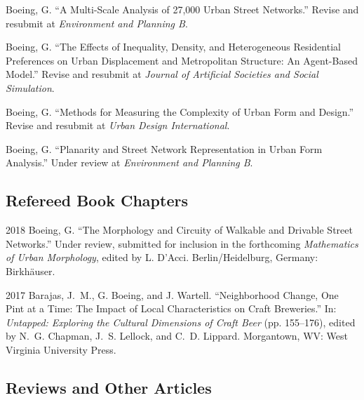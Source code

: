 \documentclass{academiccv}
\begin{document}
\begin{tablist}
	
\item[\the\year] \tab Boeing, G. \enquote{A Multi-Scale Analysis of 27,000 Urban Street Networks.} Revise and resubmit at \textit{Environment and Planning B}.

\item[\the\year] \tab Boeing, G. \enquote{The Effects of Inequality, Density, and Heterogeneous Residential Preferences on Urban Displacement and Metropolitan Structure: An Agent-Based Model.} Revise and resubmit at \textit{Journal of Artificial Societies and Social Simulation}.

\item[\the\year] \tab Boeing, G. \enquote{Methods for Measuring the Complexity of Urban Form and Design.} Revise and resubmit at \textit{Urban Design International}.

\item[\the\year] \tab Boeing, G. \enquote{Planarity and Street Network Representation in Urban Form Analysis.} Under review at \textit{Environment and Planning B}.

\end{tablist}



\subsection*{Refereed Book Chapters}

\begin{tablist}

\item[2018] \tab Boeing, G. \enquote{The Morphology and Circuity of Walkable and Drivable Street Networks.} Under review, submitted for inclusion in the forthcoming \textit{Mathematics of Urban Morphology}, edited by L. D'Acci. Berlin/Heidelburg, Germany: Birkh{\"a}user.

\item[2017] \tab Barajas, J.~M., G. Boeing, and J. Wartell. \enquote{Neighborhood Change, One Pint at a Time: The Impact of Local Characteristics on Craft Breweries.} In: \textit{Untapped: Exploring the Cultural Dimensions of Craft Beer} (pp. 155--176), edited by N.~G. Chapman, J.~S. Lellock, and C.~D. Lippard. Morgantown, WV: West Virginia University Press.

\end{tablist}



\subsection*{Reviews and Other Articles}
\end{document}

